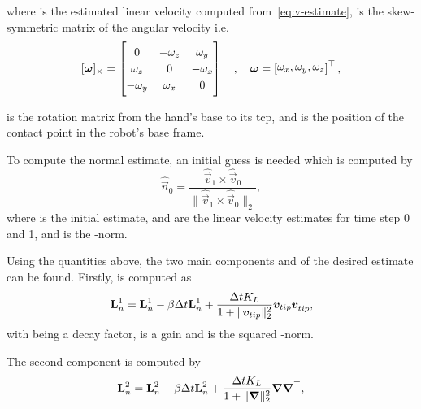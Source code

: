 where  is the estimated linear velocity computed from~\ref{eq:v-estimate},  is the skew-symmetric matrix of the angular velocity  i.e.
%
\begin{equation} \label{eq:skew-symmetric-matrix}
	[\bm{\omega}]_\times = 
	\begin{bmatrix}
		0 & -\omega_z & \omega_y \\ \omega_z & 0 & -\omega_x \\ -\omega_y & \omega_x & 0
	\end{bmatrix} \quad , \quad \bm{\omega} = \rvec{\omega_x, \omega_y, \omega_z}^\T,
\end{equation}

 is the rotation matrix from the hand's base to its \gls{tcp}, and  is the position of the contact point in the robot's base frame. \medskip

To compute the normal estimate, an initial guess is needed which is computed by
%
\begin{equation} \label{eq:def-n-init}
	\hat{\vec{n}}_{0} = \frac{\hat{\vec{v}}_{1} \times \hat{\vec{v}}_{0}}{\| \hat{\vec{v}}_{1} \times \hat{\vec{v}}_{0} \|_2},
\end{equation}
where  is the initial estimate,  and  are the linear velocity estimates for time step \num{0} and \num{1}, and  is the -norm. \medskip

Using the quantities above, the two main components  and  of the desired estimate  can be found. Firstly,  is computed as
%
\begin{equation} \label{eq:def-L-n-1}
	\bm{\mathrm{L}}_n^1 = \bm{\mathrm{L}}_n^1 - \beta \Delta t \bm{\mathrm{L}}_n^1 + \frac{\Delta t K_L}{1+\|\bm{v}_{tip}\|_2^2} \bm{v}_{tip} \bm{v}_{tip}^\top,
\end{equation}
with \mvar{\beta\inR{}} being a decay factor,  is a gain and  is the squared -norm. \medskip

The second component  is computed by
%
\begin{equation} \label{eq:def-L-2}
	\bm{\mathrm{L}}_n^2 = \bm{\mathrm{L}}_n^2 - \beta \Delta t \bm{\mathrm{L}}_n^2 + \frac{\Delta t K_L}{1+\|\bm{\nabla}\|_2^2} \bm{\nabla} \bm{\nabla}^\top,
\end{equation}

